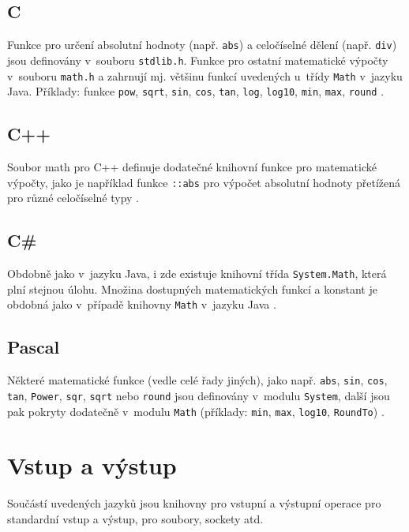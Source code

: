 \documentclass[onepage, a4paper, 12pt]{bakalarka}
\begin{document}
\subsection{C}
Funkce pro určení absolutní hodnoty (např. \texttt{abs}) a celočíselné dělení (např. \texttt{div}) jsou definovány v~souboru \texttt{stdlib.h}. Funkce pro ostatní matematické výpočty v~souboru \texttt{math.h} a zahrnují mj. většinu funkcí uvedených u~třídy \texttt{Math} v~jazyku Java. Příklady: funkce \texttt{pow}, \texttt{sqrt}, \texttt{sin}, \texttt{cos}, \texttt{tan}, \texttt{log}, \texttt{log10}, \texttt{min}, \texttt{max}, \texttt{round} \cite{cpp-guide-cstdlib, cpp-guide-cmath}.

\subsection{C++}
Soubor math pro C++ definuje dodatečné knihovní funkce pro matematické výpočty, jako je například funkce \texttt{::abs} pro výpočet absolutní hodnoty přetížená pro různé celočíselné typy \cite{cpp-guide-cstdlib, cpp-guide-abs}.

\subsection{C\#}
Obdobně jako v~jazyku Java, i zde existuje knihovní třída \texttt{System.Math}, která plní stejnou úlohu. Množina dostupných matematických funkcí a konstant je obdobná jako v~případě knihovny \texttt{Math} v~jazyku Java \cite{cs-guide-math}.

\subsection{Pascal}
Některé matematické funkce (vedle celé řady jiných), jako např. \texttt{abs}, \texttt{sin}, \texttt{cos}, \texttt{tan}, \texttt{Power}, \texttt{sqr}, \texttt{sqrt} nebo \texttt{round} jsou definovány v~modulu \texttt{System}, další jsou pak pokryty dodatečně v~modulu \texttt{Math} (příklady: \texttt{min}, \texttt{max}, \texttt{log10}, \texttt{RoundTo}) \cite{pas-guide-system, pas-guide-math}.

\section{Vstup a výstup}
Součástí uvedených jazyků jsou knihovny pro vstupní a výstupní operace pro standardní vstup a výstup, pro soubory, sockety atd.
\end{document}

